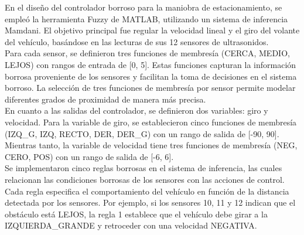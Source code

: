 \documentclass[a4paper, 12pt]{article}
\begin{document}
    En el diseño del controlador borroso para la maniobra de estacionamiento, se empleó la herramienta Fuzzy de MATLAB, utilizando un sistema de inferencia Mamdani. El objetivo principal fue regular la velocidad lineal y el giro del volante del vehículo, basándose en las lecturas de sus 12 sensores de ultrasonidos.\\
    
    Para cada sensor, se definieron tres funciones de membresía (CERCA, MEDIO, LEJOS) con rangos de entrada de [0, 5]. Estas funciones capturan la información borrosa proveniente de los sensores y facilitan la toma de decisiones en el sistema borroso. La selección de tres funciones de membresía por sensor permite modelar diferentes grados de proximidad de manera más precisa.\\
    
    En cuanto a las salidas del controlador, se definieron dos variables: giro y velocidad. Para la variable de giro, se establecieron cinco funciones de membresía (IZQ\_G, IZQ, RECTO, DER, DER\_G) con un rango de salida de [-90, 90]. Mientras tanto, la variable de velocidad tiene tres funciones de membresía (NEG, CERO, POS) con un rango de salida de [-6, 6].\\
    
    Se implementaron cinco reglas borrosas en el sistema de inferencia, las cuales relacionan las condiciones borrosas de los sensores con las acciones de control. Cada regla especifica el comportamiento del vehículo en función de la distancia detectada por los sensores. Por ejemplo, si los sensores 10, 11 y 12 indican que el obstáculo está LEJOS, la regla 1 establece que el vehículo debe girar a la IZQUIERDA\_GRANDE y retroceder con una velocidad NEGATIVA.\\
    
\end{document}
